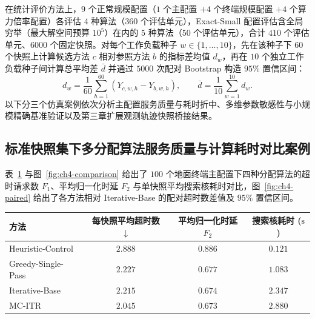 在统计评价方法上，$9$ 个正常规模配置（$1$ 个主配置 $+ 4$ 个终端规模配置 $+ 4$ 个算力倍率配置）各评估 $4$ 种算法（$360$ 个评估单元），Exact-Small 配置评估含全局穷举（最大解空间预算 $10^5$）在内的 $5$ 种算法（$50$ 个评估单元），合计 $410$ 个评估单元、$6000$ 个固定快照。对每个工作负载种子 $w\in\{1,\ldots,10\}$，先在该种子下 $60$ 个快照上计算候选方法 $c$ 相对参照方法 $b$ 的指标差均值 $d_w$，再在 $10$ 个独立工作负载种子间计算总平均差 $\bar{d}$ 并通过 $5000$ 次配对 Bootstrap 构造 $95\%$ 置信区间：
\begin{equation}
 d_w=\frac{1}{60}\sum_{h=1}^{60}
 \left(Y_{c,w,h}-Y_{b,w,h}\right),\qquad
 \bar d=\frac{1}{10}\sum_{w=1}^{10}d_w.
 \label{eq:ch4-workload-pairing}
\end{equation}
以下分三个仿真案例依次分析主配置服务质量与耗时折中、多维参数敏感性与小规模精确基准验证以及第三章扩展观测轨迹快照桥接结果。

\subsection{标准快照集下多分配算法服务质量与计算耗时对比案例}
\label{sec:ch4-main-results}
\label{sec:ch4-quality-latency-tradeoff}
\label{sec:ch4-main-timing}
\label{sec:ch4-search-behavior}

表~\ref{tab:chapter4-main} 与图~\ref{fig:ch4-comparison} 给出了 $100$ 个地面终端主配置下四种分配算法的超时请求数 $F_1$、平均归一化时延 $F_2$ 与单快照平均搜索核耗时对比，图~\ref{fig:ch4-paired} 给出了各方法相对 Iterative-Base 的配对超时数差值及 $95\%$ 置信区间。

\begin{table}[!htbp]
    \centering
    \label{tab:chapter4-main}
    \begin{tabular}{lccc}
        \toprule
        方法 & 每快照平均超时数 $\downarrow$ & 平均归一化时延 $F_2$ & 搜索核耗时 ($\mathrm{s}$) \\
        \midrule
        Heuristic-Control & $2.888$ & $0.886$ & $0.121$ \\
        Greedy-Single-Pass & $2.227$ & $0.677$ & $1.083$ \\
        Iterative-Base & $2.215$ & $0.674$ & $2.347$ \\
        MC-ITR & $2.045$ & $0.673$ & $2.880$ \\
        \bottomrule
    \end{tabular}
\end{table}

